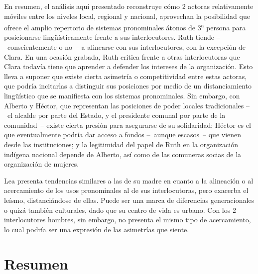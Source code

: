 \documentclass[output=paper]{../langscibook}
\begin{document}
En resumen, el análisis aquí presentado reconstruye cómo 2 actoras relativamente móviles entre los niveles local, regional y nacional, aprovechan la posibilidad que ofrece el amplio repertorio de sistemas pronominales átonos de 3\textsuperscript{a} persona para posicionarse lingüísticamente frente a sus interlocutores. Ruth tiende -- conscientemente o no -- a alinearse con sus interlocutores, con la excepción de Clara. En una ocasión grabada, Ruth critica frente a otras interlocutoras que Clara todavía tiene que aprender a defender los intereses de la organización. Esto lleva a suponer que existe cierta asimetría o competitividad entre estas actoras, que podría incitarlas a distinguir sus posiciones por medio de un distanciamiento lingüístico que se manifiesta con los sistemas pronominales. Sin embargo, con Alberto y Héctor, que representan las posiciones de poder locales tradicionales -- el alcalde por parte del Estado, y el presidente comunal por parte de la comunidad -- existe cierta presión para asegurarse de su solidaridad: Héctor es el que eventualmente podría dar acceso a fondos -- aunque escasos -- que vienen desde las instituciones; y la legitimidad del papel de Ruth en la organización indígena nacional depende de Alberto, así como de las comuneras socias de la organización de mujeres.

Lea presenta tendencias similares a las de su madre en cuanto a la alineación o al acercamiento de los usos pronominales al de sus interlocutoras, pero exacerba el leísmo, distanciándose de ellas. Puede ser una marca de diferencias generacionales o quizá también culturales, dado que su centro de vida es urbano. Con los 2 interlocutores hombres, sin embargo, no presenta el mismo tipo de acercamiento, lo cual podría ser una expresión de las asimetrías que siente. 

\section{Resumen}\label{sec:mick:8}
\end{document}
